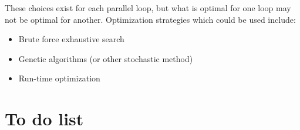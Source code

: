 \documentclass[12pt]{article}
\begin{document}
These choices exist for each parallel loop, but what is optimal
for one loop may not be optimal for another.
Optimization strategies which could be used include:
\begin{itemize}
\item
Brute force exhaustive search

%

\item
Genetic algorithms (or other stochastic method)


\item
Run-time optimization


\end{itemize}


\newpage

\section{To do list}
\end{document}
